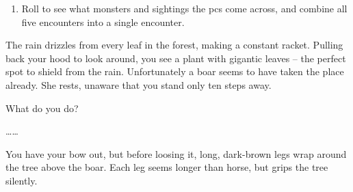 \begin{multicols}{2}
\begin{enumerate}
  \item
  Roll to see what monsters and sightings the \glspl{pc} come across, and combine all five encounters into a single encounter.

\end{enumerate}

  \begin{speechtext}
    The rain drizzles from every leaf in the forest, making a constant racket.
    Pulling back your hood to look around, you see a plant with gigantic leaves -- the perfect spot to shield from the rain.
    Unfortunately a boar seems to have taken the place already.
    She rests, unaware that you stand only ten steps away.

    What do you do?
  \end{speechtext}

  \ldots\ldots

  \begin{speechtext}
    You have your bow out, but before loosing it, long, dark-brown legs wrap around the tree above the boar.
    Each leg seems longer than horse, but grips the tree silently.
  \end{speechtext}


\end{multicols}

\vfill\null

\clearpage

